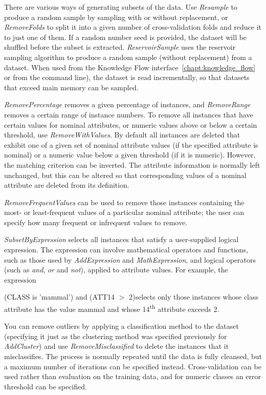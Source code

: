 There are various ways of generating subsets of the data. Use
\textit{Resample} to produce a random sample by sampling with or
without replacement, or \textit{RemoveFolds} to split it into a given
number of cross-validation folds and reduce it to just one of them. If
a random number seed is provided, the dataset will be shuffled before
the subset is extracted. \textit{ReservoirSample} uses the reservoir
sampling algorithm to produce a random sample (without replacement)
from a dataset. When used from the Knowledge Flow
interface~\ref{chapt:knowledge_flow} or from the command line), the
dataset is read incrementally, so that datasets that exceed main
memory can be sampled.

\textit{RemovePercentage} removes a given percentage of instances, and
\textit{RemoveRange} removes a certain range of instance numbers. To
remove all instances that have certain values for nominal attributes,
or numeric values above or below a certain threshold, use
\textit{RemoveWithValues}. By default all instances are deleted that
exhibit one of a given set of nominal attribute values (if the
specified attribute is nominal) or a numeric value below a given
threshold (if it is numeric). However, the matching criterion can be
inverted. The attribute information is normally left unchanged, but
this can be altered so that corresponding values of a nominal
attribute are deleted from its definition.

\textit{RemoveFrequentValues} can be used to remove those instances
containing the most- or least-frequent values of a particular nominal
attribute; the user can specify how many frequent or infrequent values
to remove.

\textit{SubsetByExpression} selects all instances that satisfy a
user-supplied logical expression. The expression can involve
mathematical operators and functions, such as those used by
\textit{AddExpression} and \textit{MathExpression}, and logical
operators (such as \textit{and}, \textit{or} and \textit{not}),
applied to attribute values. For example, the expression\newline

(CLASS is 'mammal') and (ATT14 $>$ 2)\newline \newline selects only those instances whose class attribute has the value
mammal and whose 14\textsuperscript{th} attribute exceeds 2.

You can remove outliers by applying a classification method to the
dataset (specifying it just as the clustering method was specified
previously for \textit{AddCluster}) and use
\textit{RemoveMisclassified} to delete the instances that it
misclassifies. The process is normally repeated until the data is
fully cleansed, but a maximum number of iterations can be specified
instead. Cross-validation can be used rather than evaluation on the
training data, and for numeric classes an error threshold can be
specified.

